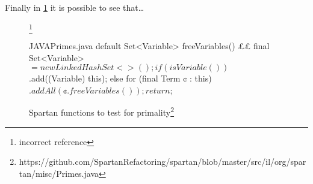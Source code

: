 Finally in \cref{figure:shock-3} it is possible to see that… 

\begin{figure}[ht]
  \matteo\footnote{incorrect reference} 
    \caption{%
      Spartan functions to test for primality\footnote{%
        https://github.com/SpartanRefactoring/spartan/blob/master/src/il/org/spartan/misc/Primes.java
      }
    }
\label{figure:shock-3}
\begin{Code}{JAVA}{Primes.java}
default Set<Variable> freeVariables() {££
    final Set<Variable> $ = new LinkedHashSet<>();
    if (isVariable())
      $.add((Variable) this);
    else
      for (final Term ¢ : this)
        $.addAll(¢.freeVariables());
    return $;
  }
\end{Code}
\end{figure}
